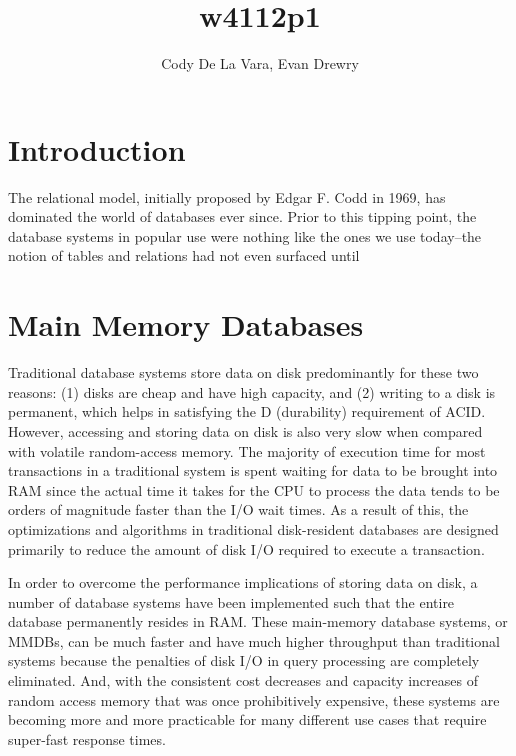 \documentclass[11pt,a4paper]{report}
\author{Cody De La Vara, Evan Drewry}
\title{w4112p1}
\begin{document}
\maketitle

\chapter*{Introduction}
The relational model, initially proposed by Edgar F. Codd in 1969, has dominated the world of databases ever since.\cite{cod70} Prior to this tipping point, the database systems in popular use were nothing like the ones we use today--the notion of tables and relations had not even surfaced until 


\chapter{Main Memory Databases}
Traditional database systems store data on disk predominantly for these two reasons: (1) disks are cheap and have high capacity, and (2) writing to a disk is permanent, which helps in satisfying the D (durability) requirement of ACID. However, accessing and storing data on disk is also very slow when compared with volatile random-access memory. The majority of execution time for most transactions in a traditional system is spent waiting for data to be brought into RAM since the actual time it takes for the CPU to process the data tends to be orders of magnitude faster than the I/O wait times. As a result of this, the optimizations and algorithms in traditional disk-resident databases are designed primarily to reduce the amount of disk I/O required to execute a transaction.

In order to overcome the performance implications of storing data on disk, a number of database systems have been implemented such that the entire database permanently resides in RAM. These main-memory database systems, or MMDBs, can be much faster and have much higher throughput than traditional systems because the penalties of disk I/O in query processing are completely eliminated. And, with the consistent cost decreases and capacity increases of random access memory that was once prohibitively expensive, these systems are becoming more and more practicable for many different use cases that require super-fast response times. 
\end{document}
